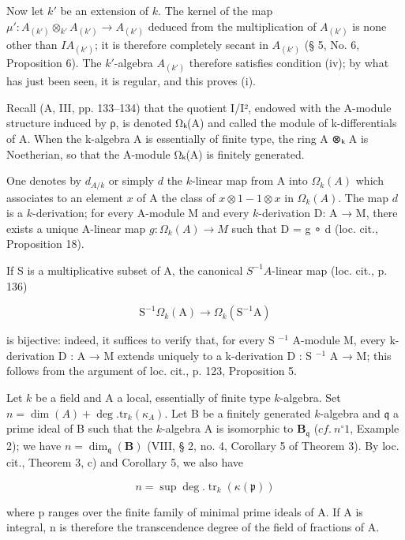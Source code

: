 Now let \(k'\) be an extension of \(k\). The kernel of the map \(\mu': A_{(k')} \otimes_{k'} A_{(k')} \to A_{(k')}\) deduced from the multiplication of \(A_{(k')}\) is none other than \(IA_{(k')}\); it is therefore completely secant in \(A_{(k')}\) (§ 5, No. 6, Proposition 6). The \(k'\)-algebra \(A_{(k')}\) therefore satisfies condition (iv); by what has just been seen, it is regular, and this proves (i).

Recall (A, III, pp. 133–134) that the quotient I/I², endowed with the A-module structure induced by ρ, is denoted Ωₖ(A) and called the module of k-differentials of A. When the k-algebra A is essentially of finite type, the ring A ⊗ₖ A is Noetherian, so that the A-module Ωₖ(A) is finitely generated.

One denotes by \(d_{A/k}\) or simply \(d\) the \(k\)-linear map from A into \(\Omega_k(A)\) which associates to an element \(x\) of A the class of \(x \otimes 1 - 1 \otimes x\) in \(\Omega_k(A)\). The map \(d\) is a \(k\)-derivation; for every A-module M and every \(k\)-derivation D: A → M, there exists a unique A-linear map \(g: \Omega_k(A) \to M\) such that D = g ∘ d (loc. cit., Proposition 18).

If S is a multiplicative subset of A, the canonical \(S^{-1}A\)-linear map (loc. cit., p. 136)

\[
\mathrm{S} ^ {- 1} \Omega_ {k} (\mathrm{A}) \rightarrow \Omega_ {k} (\mathrm{S} ^ {- 1} \mathrm{A})
\]

is bijective: indeed, it suffices to verify that, for every S \(^{-1}\) A-module M, every k-derivation D : A → M extends uniquely to a k-derivation D : S \(^{-1}\) A → M; this follows from the argument of loc. cit., p. 123, Proposition 5.

Let \(k\) be a field and A a local, essentially of finite type \(k\)-algebra. Set \(n = \dim(A) + \deg.\mathrm{tr}_k(\kappa_A)\). Let B be a finitely generated \(k\)-algebra and \(\mathfrak{q}\) a prime ideal of B such that the \(k\)-algebra A is isomorphic to \(\mathbf{B}_{\mathfrak{q}}\) (\(cf.\ n^{\circ} 1\), Example 2); we have \(n = \dim_{\mathfrak{q}}(\mathbf{B})\) (VIII, § 2, no. 4, Corollary 5 of Theorem 3). By loc. cit., Theorem 3, c) and Corollary 5, we also have

\[
n = \sup \deg . \operatorname{tr} _ {k} (\kappa (\mathfrak {p}))
\]

where p ranges over the finite family of minimal prime ideals of A. If A is integral, n is therefore the transcendence degree of the field of fractions of A.

